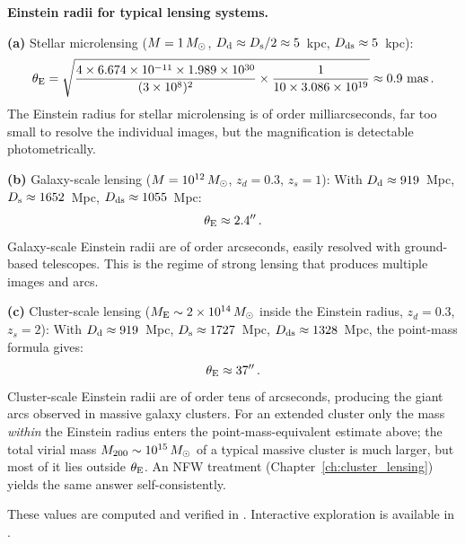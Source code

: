 \begin{example}
\label{ex:einstein_radius_values}
\textbf{Einstein radii for typical lensing systems.}

\medskip
\noindent\textbf{(a)} Stellar microlensing ($M = 1\,M_{\odot}$,
$D_{\mathrm{d}} \approx D_{\mathrm{s}}/2 \approx 5$~kpc, $D_{\mathrm{ds}} \approx 5$~kpc):
\begin{equation}
    \theta_{\mathrm{E}} = \sqrt{\frac{4 \times 6.674 \times 10^{-11} \times
    1.989 \times 10^{30}}{(3 \times 10^{8})^2} \times
    \frac{1}{10 \times 3.086 \times 10^{19}}}
    \approx 0.9~\text{mas} \,.
    \label{eq:thetaE_microlensing}
\end{equation}
The Einstein radius for stellar microlensing is of order
milliarcseconds, far too small to resolve the individual
images, but the magnification is detectable photometrically.

\medskip
\noindent\textbf{(b)} Galaxy-scale lensing ($M = 10^{12}\,M_{\odot}$,
$z_d = 0.3$, $z_s = 1$):
With $D_{\mathrm{d}} \approx 919$~Mpc, $D_{\mathrm{s}} \approx 1652$~Mpc,
$D_{\mathrm{ds}} \approx 1055$~Mpc:
\begin{equation}
    \theta_{\mathrm{E}} \approx 2.4'' \,.
    \label{eq:thetaE_galaxy}
\end{equation}
Galaxy-scale Einstein radii are of order arcseconds,
easily resolved with ground-based telescopes.  This is the regime
of strong lensing that produces multiple images and arcs.

\medskip
\noindent\textbf{(c)} Cluster-scale lensing ($M_{\mathrm{E}} \sim
2 \times 10^{14}\,M_{\odot}$ inside the Einstein radius,
$z_d = 0.3$, $z_s = 2$):
With $D_{\mathrm{d}} \approx 919$~Mpc, $D_{\mathrm{s}} \approx 1727$~Mpc,
$D_{\mathrm{ds}} \approx 1328$~Mpc, the point-mass formula gives:
\begin{equation}
    \theta_{\mathrm{E}} \approx 37'' \,.
    \label{eq:thetaE_cluster}
\end{equation}
Cluster-scale Einstein radii are of order tens of arcseconds,
producing the giant arcs observed in massive galaxy
clusters.  For an extended cluster only the mass
\emph{within} the Einstein radius enters the point-mass-equivalent
estimate above; the total virial mass $M_{200} \sim 10^{15}\,M_{\odot}$
of a typical massive cluster is much larger, but most of it lies
outside $\theta_{\mathrm{E}}$.  An NFW treatment (Chapter~\ref{ch:cluster_lensing}) yields the same
answer self-consistently.

\medskip
\noindent
These values are computed and verified in
.
Interactive exploration is available in
.
\end{example}
